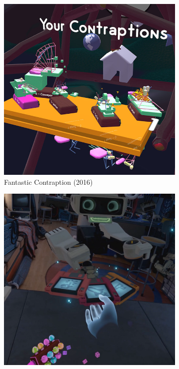\documentclass[12pt]{article}
\begin{document}
\begin{figure}
\centering
\begin{subfigure}{.33\textwidth}
  \centering
  \includegraphics[width=.95\linewidth]{fantasticcontraption.jpg}
  \caption{Fantastic Contraption (2016)}
\end{subfigure}%
\begin{subfigure}{.33\textwidth}
  \centering
  \includegraphics[width=.95\linewidth]{firstcontact.png}

\end{subfigure}
\end{figure}
\end{document}
